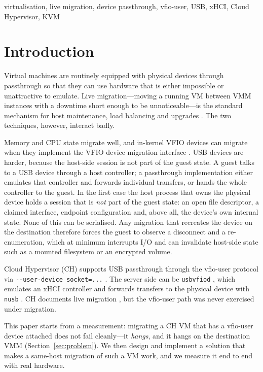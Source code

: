 \documentclass[10pt,conference]{IEEEtran}
\newcommand{\code}[1]{\texttt{#1}}
\begin{document}
\begin{IEEEkeywords}
virtualisation, live migration, device passthrough, vfio-user, USB, xHCI,
Cloud Hypervisor, KVM
\end{IEEEkeywords}

\section{Introduction}

Virtual machines are routinely equipped with physical devices through
passthrough so that they can use hardware that is either impossible or
unattractive to emulate. Live migration---moving a running VM between VMM
instances with a downtime short enough to be unnoticeable---is the standard
mechanism for host maintenance, load balancing and upgrades
\cite{clark2005live}. The two techniques, however, interact badly.

Memory and CPU state migrate well, and in-kernel VFIO devices can migrate when they implement the VFIO device
migration interface \cite{vfiomigrationuapi}. USB
devices are harder, because the host-side session is not part of the guest
state. A guest talks to a USB device through a host
controller; a passthrough implementation either emulates that controller and
forwards individual transfers, or hands the whole controller to the guest. In
the first case the host process that owns the physical device holds a session
that is \emph{not} part of the guest state: an open file descriptor, a claimed
interface, endpoint configuration and, above all, the device's own internal
state. None of this can be serialised. Any migration that recreates the device
on the destination therefore forces the guest to observe a disconnect and a
re-enumeration, which at minimum interrupts I/O and can invalidate host-side
state such as a mounted filesystem or an encrypted volume.

Cloud Hypervisor (CH) supports USB passthrough through the vfio-user protocol
via \code{-{}-user-device socket=...} \cite{chvfiouser}. The server side can be
\code{usbvfiod} \cite{usbvfiodrepo}, which emulates an xHCI controller and
forwards transfers to the physical device with \code{nusb} \cite{nusb}. CH
documents live migration \cite{chlive}, but the vfio-user path was never
exercised under migration.

This paper starts from a measurement: migrating a CH VM that has a vfio-user
device attached does not fail cleanly---it \emph{hangs}, and it hangs on the
destination VMM (Section~\ref{sec:problem}). We then design and implement a
solution that makes a same-host migration of such a VM work, and we measure it
end to end with real hardware.
\end{document}
